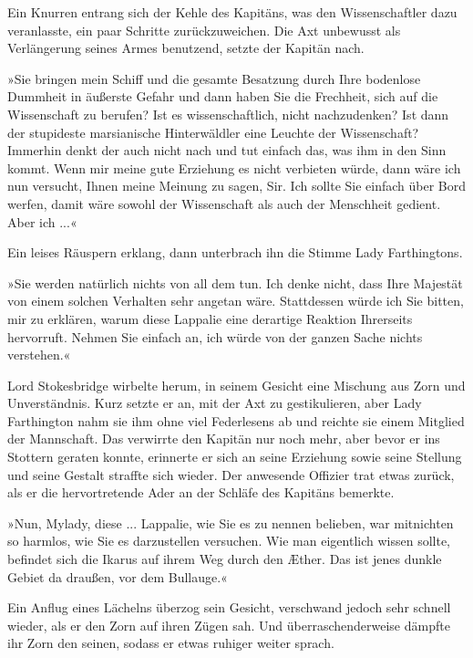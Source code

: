 Ein Knurren entrang sich der Kehle des Kapitäns, was den
Wissenschaftler dazu veranlasste, ein paar Schritte
zurückzuweichen. Die Axt unbewusst als Verlängerung seines Armes
benutzend, setzte der Kapitän nach.

»Sie bringen mein Schiff und die gesamte Besatzung durch Ihre
bodenlose Dummheit in äußerste Gefahr und dann haben Sie die
Frechheit, sich auf die Wissenschaft zu berufen? Ist es
wissenschaftlich, nicht nachzudenken? Ist dann der stupideste
marsianische Hinterwäldler eine Leuchte der Wissenschaft? Immerhin
denkt der auch nicht nach und tut einfach das, was ihm in den Sinn
kommt. Wenn mir meine gute Erziehung es nicht verbieten würde, dann
wäre ich nun versucht, Ihnen meine Meinung zu sagen, Sir. Ich
sollte Sie einfach über Bord werfen, damit wäre sowohl der
Wissenschaft als auch der Menschheit gedient. Aber ich ...«

Ein leises Räuspern erklang, dann unterbrach ihn die Stimme Lady
Farthingtons.

»Sie werden natürlich nichts von all dem tun. Ich denke nicht, dass
Ihre Majestät von einem solchen Verhalten sehr angetan wäre.
Stattdessen würde ich Sie bitten, mir zu erklären, warum diese
Lappalie eine derartige Reaktion Ihrerseits hervorruft. Nehmen Sie
einfach an, ich würde von der ganzen Sache nichts verstehen.«

Lord Stokesbridge wirbelte herum, in seinem Gesicht eine Mischung
aus Zorn und Unverständnis. Kurz setzte er an, mit der Axt zu
gestikulieren, aber Lady Farthington nahm sie ihm ohne viel
Federlesens ab und reichte sie einem Mitglied der Mannschaft. Das
verwirrte den Kapitän nur noch mehr, aber bevor er ins Stottern
geraten konnte, erinnerte er sich an seine Erziehung sowie seine
Stellung und seine Gestalt straffte sich wieder. Der anwesende
Offizier trat etwas zurück, als er die hervortretende Ader an der
Schläfe des Kapitäns bemerkte.

»Nun, Mylady, diese ... Lappalie, wie Sie es zu nennen belieben,
war mitnichten so harmlos, wie Sie es darzustellen versuchen. Wie
man eigentlich wissen sollte, befindet sich die Ikarus auf ihrem
Weg durch den Æther. Das ist jenes dunkle Gebiet da draußen, vor
dem Bullauge.«

Ein Anflug eines Lächelns überzog sein Gesicht, verschwand jedoch
sehr schnell wieder, als er den Zorn auf ihren Zügen sah. Und
überraschenderweise dämpfte ihr Zorn den seinen, sodass er etwas
ruhiger weiter sprach.

